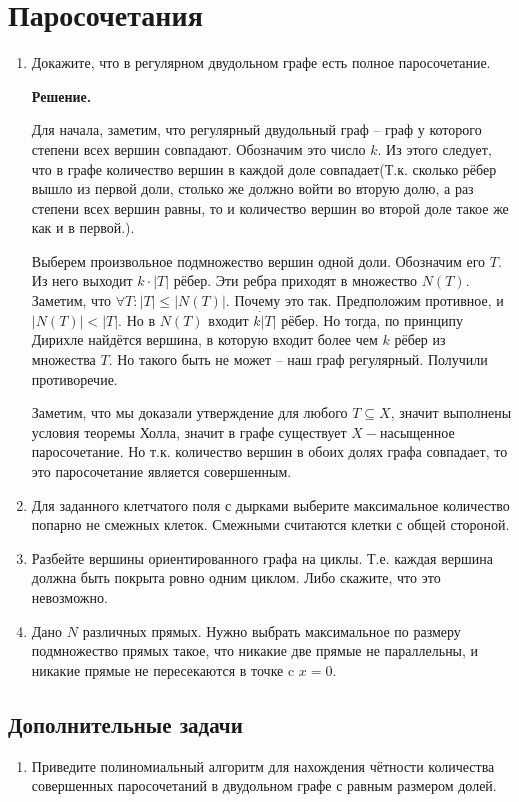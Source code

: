 \section*{Паросочетания}
\begin{enumerate}
	\item Докажите, что в регулярном двудольном графе есть полное паросочетание.
	
	\textbf{Решение.} 
	
	Для начала, заметим, что регулярный двудольный граф -- граф у которого степени всех вершин совпадают. Обозначим 
	это число $k$. Из этого следует, что в графе количество вершин в каждой доле совпадает(Т.к. сколько рёбер вышло 
	из первой доли, столько же должно войти во вторую долю, а раз степени всех вершин равны, то и количество 
	вершин во второй доле такое же как и в первой.).
	
	Выберем произвольное подмножество вершин одной доли. Обозначим его $T$. Из него выходит $k \cdot |T|$ рёбер.
	Эти ребра приходят в множество $N(T)$. Заметим, что $\forall T: |T|\leqslant |N(T)|$. Почему это так. 
	Предположим противное, и $|N(T)| < |T|$. Но в $N(T)$ входит $k \dot |T|$ рёбер. Но тогда, по принципу Дирихле 
	найдётся вершина, в которую входит более чем $k$ рёбер из множества $T$. Но такого быть не может -- наш 
	граф регулярный. Получили противоречие. 
	
	Заметим, что мы доказали утверждение для любого $T \subseteq X$, значит выполнены условия теоремы Холла, 
	значит в графе существует $X-$насыщенное паросочетание. Но т.к. количество вершин в обоих долях графа 
	совпадает, то это паросочетание является совершенным.
	
	\item Для заданного клетчатого поля с дырками выберите максимальное количество попарно не смежных клеток. 
	Смежными считаются клетки с общей стороной.
	\item Разбейте вершины ориентированного графа на циклы. Т.е. каждая вершина должна быть покрыта ровно одним 
	циклом. Либо скажите, что это невозможно.
	\item Дано $N$ различных прямых. Нужно выбрать максимальное по размеру подмножество прямых такое, что никакие 
	две прямые не параллельны, и никакие прямые не пересекаются в точке c $x = 0$.
\end{enumerate}

\subsection*{Дополнительные задачи}
\begin{enumerate}
	\item Приведите полиномиальный алгоритм для нахождения чётности количества совершенных паросочетаний в 
	двудольном графе с равным размером долей.
\end{enumerate}